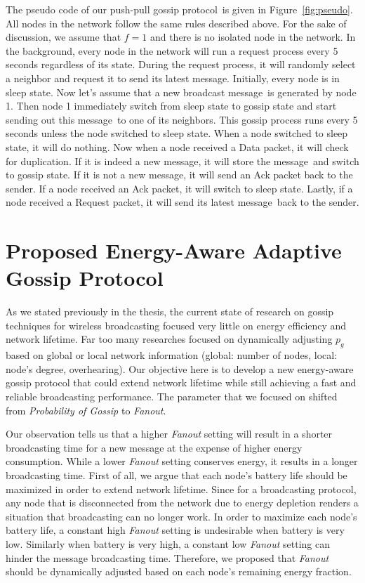 \documentclass[onehalf,11pt]{beavtex}
\newcommand{\gp}{gossip protocol}
\newcommand{\pog}{Probability of Gossip}
\newcommand{\msg}{message}
\begin{document}
The pseudo code of our push-pull \gp ~is given in Figure~\ref{fig:pseudo}. All nodes in the network follow the same rules described above. For the sake of discussion, we assume that $f=1$ and there is no isolated node in the network. In the background, every node in the network will run a request process every 5 seconds regardless of its state. During the request process, it will randomly select a neighbor and request it to send its latest \msg. Initially, every node is in sleep state. Now let's assume that a new broadcast \msg ~is generated by node 1. Then node 1 immediately switch from sleep state to gossip state and start sending out this \msg ~to one of its neighbors. This gossip process runs every 5 seconds unless the node switched to sleep state. When a node switched to sleep state, it will do nothing. Now when a node received a Data packet, it will check for duplication. If it is indeed a new \msg, it will store the \msg ~and switch to gossip state. If it is not a new \msg, it will send an Ack packet back to the sender. If a node received an Ack packet, it will switch to sleep state. Lastly, if a node received a Request packet, it will send its latest \msg ~back to the sender. 

\section{Proposed Energy-Aware Adaptive Gossip Protocol}
As we stated previously in the thesis, the current state of research on gossip techniques for wireless broadcasting focused very little on energy efficiency and network lifetime. Far too many researches focused on dynamically adjusting $p_g$ based on global or local network information (global: number of nodes, local: node's degree, overhearing). Our objective here is to develop a new energy-aware gossip protocol that could extend network lifetime while still achieving a fast and reliable broadcasting performance. The parameter that we focused on shifted from \emph{\pog} to \emph{Fanout}.

Our observation tells us that a higher \emph{Fanout} setting will result in a shorter broadcasting time for a new message at the expense of higher energy consumption. While a lower \emph{Fanout} setting conserves energy, it results in a longer broadcasting time. First of all, we argue that each node's battery life should be maximized in order to extend network lifetime. Since for a broadcasting protocol, any node that is disconnected from the network due to energy depletion renders a situation that broadcasting can no longer work. In order to maximize each node's battery life, a constant high \emph{Fanout} setting is undesirable when battery is very low. Similarly when battery is very high, a constant low \emph{Fanout} setting can hinder the message broadcasting time. Therefore, we proposed that \emph{Fanout} should be dynamically adjusted based on each node's remaining energy fraction. 
\end{document}
